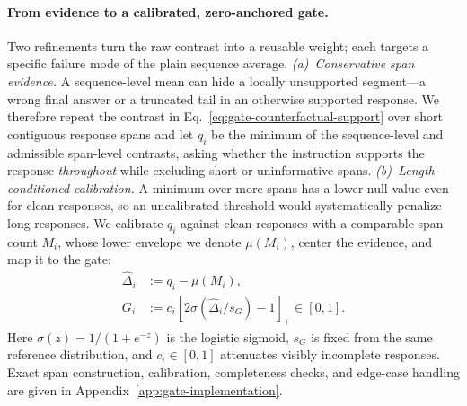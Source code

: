 \paragraph{From evidence to a calibrated, zero-anchored gate.}
Two refinements turn the raw contrast into a reusable weight; each
targets a specific failure mode of the plain sequence average.
\emph{(a)~Conservative span evidence.} A sequence-level mean can
hide a locally unsupported segment---a wrong final answer or a
truncated tail in an otherwise supported response. We therefore
repeat the contrast in Eq.~\eqref{eq:gate-counterfactual-support}
over short contiguous response spans and let \(q_i\) be the minimum
of the sequence-level and admissible span-level contrasts, asking
whether the instruction supports the response \emph{throughout}
while excluding short or uninformative spans.
\emph{(b)~Length-conditioned calibration.} A minimum over more
spans has a lower null value even for clean responses, so an
uncalibrated threshold would systematically penalize long
responses. We calibrate \(q_i\) against clean responses with a
comparable span count \(M_i\), whose lower envelope we denote
\(\mu(M_i)\), center the evidence, and map it to the gate:
\begin{equation}
\begin{aligned}
  \widehat{\Delta}_i&:=q_i-\mu(M_i),\\
  G_i
  &:=c_i\left[2\sigma\!\left(\widehat{\Delta}_i/s_G\right)-1\right]_+
  \in[0,1].
\end{aligned}
  \label{eq:reliability-gate}
\end{equation}
Here \(\sigma(z)=1/(1+e^{-z})\) is the logistic sigmoid,
\(s_G\) is fixed from the same reference distribution, and
\(c_i\in[0,1]\) attenuates visibly incomplete responses. Exact span
construction, calibration, completeness checks, and edge-case
handling are given in Appendix~\ref{app:gate-implementation}.

